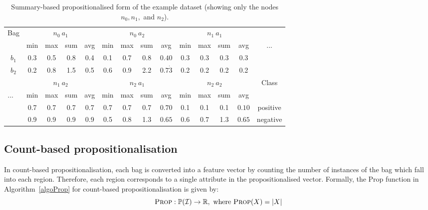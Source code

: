 \documentclass[a4paper,12pt]{report} %
\newcommand{\real}{\mathbb{R}}
\newcommand{\mcl}[1]{\mathcal{#1}}
\newcommand{\power}{\mathbb{P}}
\begin{document}
\begin{table}[p]
\begin{center}
\begin{tabular}{*{14}{c}}
    \toprule
        \multirow{2}{*}{Bag} & 
        \multicolumn{4}{c}{$n_0~a_1$} & 
        \multicolumn{4}{c}{$n_0~a_2$} & 
        \multicolumn{4}{c}{$n_1~a_1$} &
         \\
    \cmidrule(r){2-5}
    \cmidrule(r){6-9}
    \cmidrule(r){10-13}
     & min & max & sum & avg & min & max & sum & avg & min & max & sum & avg & \multirow{2}{*}{\huge ...} \\
    \cmidrule(r){1-13}
    $b_1$ &  0.3 & 0.5 & 0.8 & 0.4  & 0.1 & 0.7 & 0.8 & $0.40$       & 0.3 & 0.3 & 0.3 & 0.3 & \\
    $b_2$ &  0.2 & 0.8 & 1.5 & 0.5  & 0.6 & 0.9 & 2.2 & $0.7\dot{3}$ & 0.2 & 0.2 & 0.2 & 0.2 & \\
	\bottomrule    
	\addlinespace
    \toprule
    	 & 
        \multicolumn{4}{c}{$n_1~a_2$} & 
        \multicolumn{4}{c}{$n_2~a_1$} & 
        \multicolumn{4}{c}{$n_2~a_2$} &
        \multirow{2}{*}{Class} \\
    \cmidrule(r){2-5}
    \cmidrule(r){6-9}
    \cmidrule(r){10-13}
    \multirow{2}{*}{\huge ... ~}  & min & max & sum & avg & min & max & sum & avg & min & max & sum & avg & \\
    \cmidrule(r){2-14}
     &  0.7 & 0.7 & 0.7 & 0.7  & 0.7 & 0.7 & 0.7 & $0.70$  & 0.1 & 0.1 & 0.1 & $0.10$ & positive\\
     &  0.9 & 0.9 & 0.9 & 0.9  & 0.5 & 0.8 & 1.3 & $0.65$  & 0.6 & 0.7 & 1.3 & $0.65$ & negative\\    
    \bottomrule
    
\end{tabular}
\end{center}
\caption{Summary-based propositionalised form of the example dataset 
    (showing only the nodes $n_0, n_1,$ and $n_2$).}
\label{tEgPropAgg}
\end{table}    

\subsection{Count-based propositionalisation}
\label{ssecPropCount}

In count-based propositionalisation, 
    each bag is converted into a feature vector by
    counting the number of instances of the bag which
    fall into each region.
Therefore, each region corresponds to a single attribute in the 
    propositionalised vector.
Formally, the {\sc Prop} function in Algorithm~\ref{algoProp} 
    for count-based propositionalisation is given by:
$$ \textrm{\sc Prop}: \power(\mcl{I}) \to \real,\mathrm{~where~}\textrm{\sc Prop}(X) = |X|$$
\end{document}
